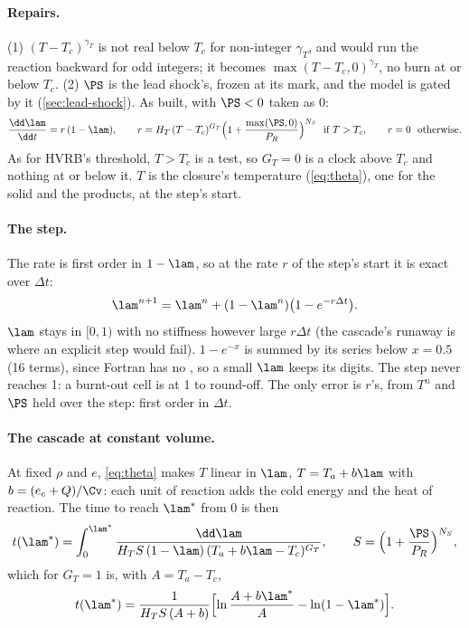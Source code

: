 \paragraph{Repairs.} (1) $(T - T_c)^{\gamma_T}$ is not real below $T_c$ for
non-integer $\gamma_T$, and would run the reaction backward for odd
integers; it becomes $\max(T - T_c, 0)^{\gamma_T}$, no burn at or below
$T_c$. (2) $\PS$ is the lead shock's, frozen at its mark, and the model is
gated by it (\cref{sec:lead-shock}). As built, with $\PS < 0$ taken as 0:
\begin{equation}
  \frac{\dd\lam}{\dd t} = r\,(1 - \lam), \qquad
  r = H_T\,(T - T_c)^{G_T}\Bigl(1 + \frac{\max(\PS, 0)}{P_R}\Bigr)^{N_S}
  \ \text{ if } T > T_c, \qquad r = 0 \ \text{ otherwise}.
  \label{eq:tc-rate}
\end{equation}
As for HVRB's threshold, $T > T_c$ is a test, so $G_T = 0$ is a clock above
$T_c$ and nothing at or below it. $T$ is the closure's temperature
(\cref{eq:theta}), one for the solid and the products, at the step's start.

\paragraph{The step.} The rate is first order in $1 - \lam$, so at the rate
$r$ of the step's start it is exact over $\Delta t$:
\begin{equation}
  \lam^{n+1} = \lam^n + (1 - \lam^n)\bigl(1 - e^{-r\Delta t}\bigr).
  \label{eq:tc-step}
\end{equation}
$\lam$ stays in $[0, 1)$ with no stiffness however large $r\Delta t$ (the
cascade's runaway is where an explicit step would fail). $1 - e^{-x}$ is
summed by its series below $x = 0.5$ (16 terms), since Fortran has no
, so a small $\lam$ keeps its digits. The step never reaches 1:
a burnt-out cell is at 1 to round-off. The only error is $r$'s, from $T^n$
and $\PS$ held over the step: first order in $\Delta t$.

\paragraph{The cascade at constant volume.} At fixed $\rho$ and $e$,
\cref{eq:theta} makes $T$ linear in $\lam$, $T = T_a + b\lam$ with $b = (e_c +
Q)/\Cv$: each unit of reaction adds the cold energy and the heat of reaction.
The time to reach $\lam^\ast$ from 0 is then
\begin{equation}
  t(\lam^\ast) = \int_0^{\lam^\ast}
    \frac{\dd\lam}{H_T S\,(1 - \lam)\,(T_a + b\lam - T_c)^{G_T}},
  \qquad S = \Bigl(1 + \frac{\PS}{P_R}\Bigr)^{N_S},
  \label{eq:tc-cascade}
\end{equation}
which for $G_T = 1$ is, with $A = T_a - T_c$,
\begin{equation}
  t(\lam^\ast) = \frac{1}{H_T S\,(A + b)}
  \Bigl[\ln\frac{A + b\lam^\ast}{A} - \ln(1 - \lam^\ast)\Bigr].
  \label{eq:tc-cascade-gt1}
\end{equation}

